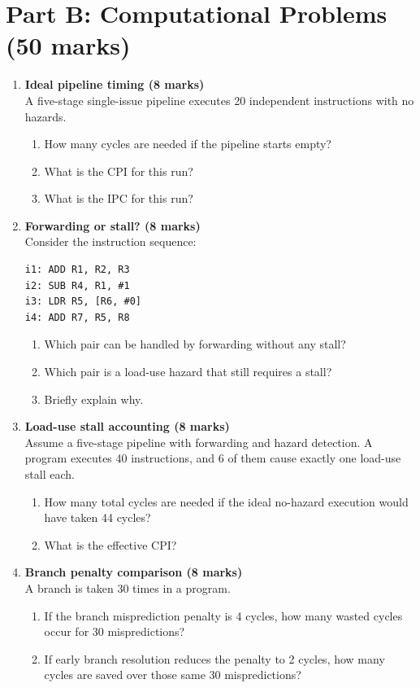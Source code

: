 \documentclass[11pt]{article}
\begin{document}
\section*{Part B: Computational Problems (50 marks)}
\begin{enumerate}[label=\textbf{B\arabic*.}]
  \item \textbf{Ideal pipeline timing (8 marks)}\\
  A five-stage single-issue pipeline executes 20 independent instructions with no hazards.
  \begin{enumerate}[label=(\alph*)]
    \item How many cycles are needed if the pipeline starts empty?
    \item What is the CPI for this run?
    \item What is the IPC for this run?
  \end{enumerate}

  \item \textbf{Forwarding or stall? (8 marks)}\\
  Consider the instruction sequence:
\begin{verbatim}
i1: ADD R1, R2, R3
i2: SUB R4, R1, #1
i3: LDR R5, [R6, #0]
i4: ADD R7, R5, R8
\end{verbatim}
  \begin{enumerate}[label=(\alph*)]
    \item Which pair can be handled by forwarding without any stall?
    \item Which pair is a load-use hazard that still requires a stall?
    \item Briefly explain why.
  \end{enumerate}

  \item \textbf{Load-use stall accounting (8 marks)}\\
  Assume a five-stage pipeline with forwarding and hazard detection. A program executes 40 instructions, and 6 of them cause exactly one load-use stall each.
  \begin{enumerate}[label=(\alph*)]
    \item How many total cycles are needed if the ideal no-hazard execution would have taken 44 cycles?
    \item What is the effective CPI?
  \end{enumerate}

  \item \textbf{Branch penalty comparison (8 marks)}\\
  A branch is taken 30 times in a program.
  \begin{enumerate}[label=(\alph*)]
    \item If the branch misprediction penalty is 4 cycles, how many wasted cycles occur for 30 mispredictions?
    \item If early branch resolution reduces the penalty to 2 cycles, how many cycles are saved over those same 30 mispredictions?
  \end{enumerate}


\end{enumerate}
\end{document}
